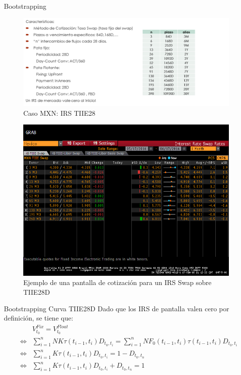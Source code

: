\documentclass[11pt]{beamer}
\begin{document}
\begin{frame}{Bootstrapping}
	\centering
	\begin{figure}
		\centering
		\includegraphics[width=\linewidth]{irs28mxn}
		\caption{Caso MXN: IRS TIIE28}
		\label{fig:irs28mxn}
	\end{figure}
	
\end{frame}

\begin{frame}{{}}
	\begin{figure}
		\centering
		\includegraphics[width=0.7\linewidth]{bloombirs}
		\caption{Ejemplo de una pantalla de cotización para un IRS Swap sobre TIIE28D}
		\label{fig:bloombirs}
	\end{figure}
	
\end{frame}


\begin{frame}{Bootstrapping Curva TIIE28D}
	Dado que los IRS de pantalla valen cero por definición, se tiene que:
	\begin{eqnarray*}
	&& V^{Fix}_{t_0}=V^{Float}_{t_0}\\
	&\iff& \sum_{i=1}^{n}N K \tau(t_{i-1}, t_{i}) D_{t_0,t_i}=\sum_{i=1}^{n}N F_0(t_{i-1},t_i) \tau(t_{i-1}, t_{i}) D_{t_0,t_i}\\
	&\iff& \sum_{i=1}^{n} K \tau(t_{i-1}, t_{i}) D_{t_0,t_i}=1-D_{t_0,t_n}\\
	&\iff & \sum_{i=1}^{n} K \tau(t_{i-1}, t_{i}) D_{t_0,t_i} +D_{t_0,t_n}=1
	\end{eqnarray*}
	
\end{frame}
\end{document}
